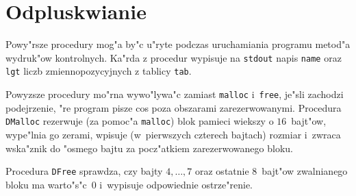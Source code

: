 \newpage
\section{Odpluskwianie}

\hspace*{\parindent}
Powy"rsze procedury mog"a by"c u"ryte podczas uruchamiania programu metod"a
wydruk"ow kontrolnych. Ka"rda z procedur wypisuje na \texttt{stdout}
napis \texttt{name} oraz \texttt{lgt} liczb zmiennopozycyjnych z tablicy
\texttt{tab}.

\vspace{\bigskipamount}
Powyzsze procedury mo"rna wywo"lywa"c zamiast \texttt{malloc} i~\texttt{free},
je"sli zachodzi podejrzenie, "re program pisze cos poza obszarami
zarezerwowanymi. Procedura \texttt{DMalloc} rezerwuje (za pomoc"a
\texttt{malloc}) blok pamieci wiekszy o $16$~bajt"ow, wype"lnia go zerami,
wpisuje (w~pierwszych czterech bajtach) rozmiar i~zwraca wska"znik do
"osmego bajtu za pocz"atkiem zarezerwowanego bloku.

Procedura \texttt{DFree} sprawdza, czy bajty $4,\ldots,7$ oraz ostatnie
$8$~bajt"ow zwalnianego bloku ma warto"s"c~$0$ i~wypisuje odpowiednie
ostrze"renie.

